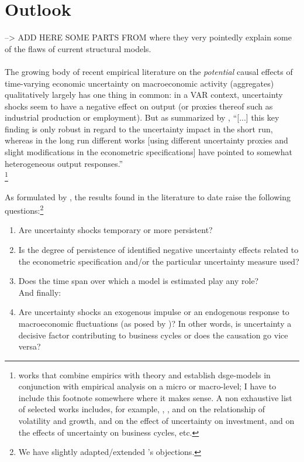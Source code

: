 \documentclass[a4paper,11pt,listof=nochaptergap,oneside,pointednumbers,bibtotoc,bigheadings,liststotoc]{scrbook}
\begin{document}
\section{Outlook}
--> ADD HERE SOME PARTS FROM \citet{ludvigsonetal:18} where they very pointedly explain some of the flaws of current structural models.\\
\\
The growing body of recent empirical literature on the \textit{potential} causal effects of time-varying economic uncertainty on macroeconomic activity (aggregates) qualitatively largely has one thing in common: in a VAR context, uncertainty shocks seem to have a negative effect on output (or proxies thereof such as industrial production or employment). But as summarized by \citet[p. 23]{bontempietal:16}, ``[...] this key finding is only robust in regard to the uncertainty impact in the short run, whereas in the long run different works [using different uncertainty proxies and slight modifications in the econometric specifications] have pointed to somewhat heterogeneous output responses.''\\
\footnote{works that combine empirics with theory and establish dsge-models in conjunction with empirical analysis on a micro or macro-level; I have to include this footnote somewhere where it makes sense. A non exhaustive list of selected works includes, for example, \citet{rameyandramey:95}, \citet{aghionetal:05}, \citet{mills:00} and \citet{imbs:07} on the relationship of volatility and growth, \citet{leahyandwhited:96} and \citet{bloometal:07} on the effect of uncertainty on investment, \citet{barlevy:04} and \citet{gilchristandwilliams:05} on the effects of uncertainty on business cycles, etc.}


As formulated by \citet[p. 24]{bontempietal:16}, the results found in the literature to date raise the following questions:\footnote{We have slightly adapted/extended \citet{bontempietal:16}'s objections.}
\begin{enumerate}
	\item Are uncertainty shocks temporary or more persistent?
	\item Is the degree of persistence of identified negative uncertainty effects related to the econometric specification and/or the particular uncertainty measure used? 
	\item Does the time span over which a model is estimated play any role? \\
	And finally:
	\item Are uncertainty shocks an exogenous impulse or an endogenous response to macroeconomic fluctuations (as posed by \citealp{ludvigsonetal:18})? In other words, is uncertainty a decisive factor contributing to business cycles or does the causation go vice versa?
\end{enumerate}
\end{document}
